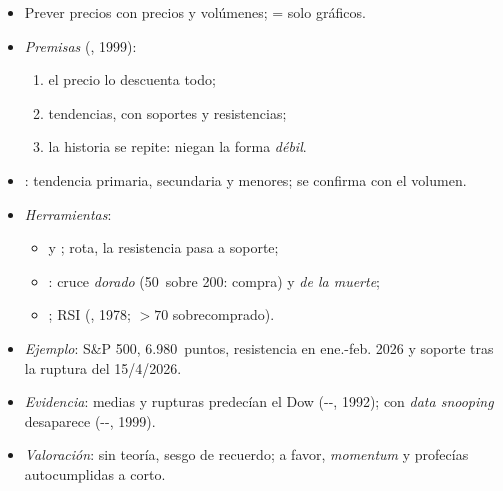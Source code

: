 \documentclass{article}
\begin{document}
\begin{columnas}
\begin{itemize}
\item Prever precios con precios y volúmenes;  = solo gráficos.
\item \emph{Premisas} (, 1999):
  \begin{enumerate}
  \item el precio lo descuenta todo;
  \item tendencias, con soportes y resistencias;
  \item la historia se repite: niegan la forma \emph{débil}.
  \end{enumerate}
\item \emph{}: tendencia primaria, secundaria y menores; se confirma con el volumen.
\item \emph{Herramientas}:
  \begin{itemize}
  \item {} y ; rota, la resistencia pasa a soporte;
  \item {}: cruce \emph{dorado} (50~sobre 200: compra) y \emph{de la muerte};
  \item {}; RSI (, 1978; $>70$ sobrecomprado).
  \end{itemize}
\end{itemize}
\begin{itemize}
\item \emph{Ejemplo}: S\&P 500, 6.980~puntos, resistencia en ene.-feb. 2026 y soporte tras la ruptura del 15/4/2026.
\item \emph{Evidencia}: medias y rupturas predecían el Dow (--, 1992); con \emph{data snooping} desaparece (--, 1999).
\item \emph{Valoración}: sin teoría, sesgo de recuerdo; a favor, \emph{momentum} y profecías autocumplidas a corto.
\end{itemize}


\end{columnas}
\end{document}
